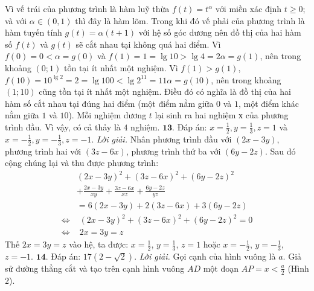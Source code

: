 \begin{multicols}{2}
	Vì vế trái của phương trình là hàm luỹ thừa $f(t)=t^{\alpha}$ với miền xác định $t \ge 0$; và với $\alpha \in  (0,1)$ thì đây là hàm lõm. Trong khi đó vế phải của phương trình là hàm tuyến tính $g(t)=\alpha(t+1)$ với hệ số góc dương nên đồ thị của hai hàm số $f(t)$ và $g(t)$ sẽ cắt nhau tại không quá hai điểm.
	\vskip 0.1cm
	Vì $f\left( 0 \right) = 0 < \alpha  = g\left( 0 \right)$ và  $f\left( 1 \right) = 1 = \lg 10 > \lg 4 = 2\alpha  = g\left( 1 \right)$, nên trong khoảng $(0;1)$ tồn tại ít nhất một nghiệm.
	\vskip 0.1cm
	Vì $f(1) > g(1)$, $f\left( {10} \right) = {10^{\lg 2}} = 2 = \lg 100 < \lg {2^{11}} = 11\alpha  = g\left( {10} \right)$, nên trong khoảng $(1;10)$ cũng tồn tại ít nhất một nghiệm.
	\vskip 0.1cm
	Điều đó có nghĩa là đồ thị của hai hàm số cắt nhau tại đúng hai điểm (một điểm nằm giữa $0$ và $1$, một điểm khác nằm giữa $1$ và $10$).
	\vskip 0.1cm 
	Mỗi nghiệm dương $t$ lại sinh ra hai nghiệm $х$ của phương trình đầu. Vì vậy, có cả thảy là $4$ nghiệm.
	\vskip 0.1cm
	$\pmb{13.}$ Đáp án:  $x = \frac{1}{2}, y = \frac{1}{3}, z= 1$  và  $x = -\frac{1}{2}, y = - \frac{1}{3}  , z= -1$.
	\vskip 0.1cm 
	\textit{Lời giải.} Nhân phương trình đầu với  $(2x - 3y)$, phương trình hai với $(3z-6x)$, phương trình thứ ba với $(6y-2z)$. Sau đó cộng chúng lại và thu được phương trình:
	\begin{align*}
		&{\left( {2x - 3y} \right)^2} + {\left( {3z - 6x} \right)^2} + {\left( {6y - 2z} \right)^2} \\
		&+ \frac{{2x - 3y}}{{xy}} + \frac{{3z - 6x}}{{xz}} + \frac{{6y - 2z}}{{yz}}\\
		&= 6\left( {2x \!-\! 3y} \right) \!+\! 2\left( {3z \!-\! 6x} \right) \!+\! 3\left( {6y \!-\! 2z} \right)\\
		\Leftrightarrow &\,\,{\left( {2x \!-\! 3y} \right)^2} \!+\! {\left( {3z \!-\! 6x} \right)^2} \!+\! {\left( {6y \!-\! 2z} \right)^2} \!=\! 0\\
		\Leftrightarrow &\,\,2x = 3y = z
	\end{align*}
	Thế $2x = 3y = z$ vào hệ, ta được:  $x = \frac{1}{2}$, $y = \frac{1}{3}$, $z =1$ hoặc $x = - \frac{1}{2}$, $y = - \frac{1}{3}$,  $z = -1$.
	\vskip 0.1cm 
	$\pmb{14.}$ Đáp án:  $17\left( {2 - \sqrt 2 } \right)$.
	\vskip 0.1cm 
	\textit{Lời giải.} Gọi cạnh của hình vuông là $a$. Giả sử đường thẳng cắt và tạo trên cạnh hình vuông $AD$ một đoạn $AP = x < \frac{a}{2}$  (Hình $2$).
	\begin{figure}[H]
		\vspace*{-5pt}
		\centering
		\captionsetup{labelformat= empty, justification=centering}

\end{figure}
\end{multicols}
